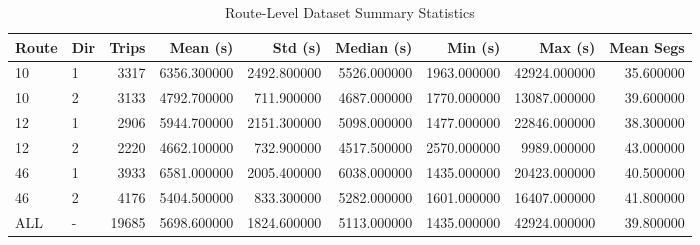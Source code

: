 \begin{table}
\caption{Route-Level Dataset Summary Statistics}
\label{tab:route_level_summary}
\begin{tabular}{llrrrrrrr}
\toprule
Route & Dir & Trips & Mean (s) & Std (s) & Median (s) & Min (s) & Max (s) & Mean Segs \\
\midrule
10 & 1 & 3317 & 6356.300000 & 2492.800000 & 5526.000000 & 1963.000000 & 42924.000000 & 35.600000 \\
10 & 2 & 3133 & 4792.700000 & 711.900000 & 4687.000000 & 1770.000000 & 13087.000000 & 39.600000 \\
12 & 1 & 2906 & 5944.700000 & 2151.300000 & 5098.000000 & 1477.000000 & 22846.000000 & 38.300000 \\
12 & 2 & 2220 & 4662.100000 & 732.900000 & 4517.500000 & 2570.000000 & 9989.000000 & 43.000000 \\
46 & 1 & 3933 & 6581.000000 & 2005.400000 & 6038.000000 & 1435.000000 & 20423.000000 & 40.500000 \\
46 & 2 & 4176 & 5404.500000 & 833.300000 & 5282.000000 & 1601.000000 & 16407.000000 & 41.800000 \\
ALL & - & 19685 & 5698.600000 & 1824.600000 & 5113.000000 & 1435.000000 & 42924.000000 & 39.800000 \\
\bottomrule
\end{tabular}
\end{table}
